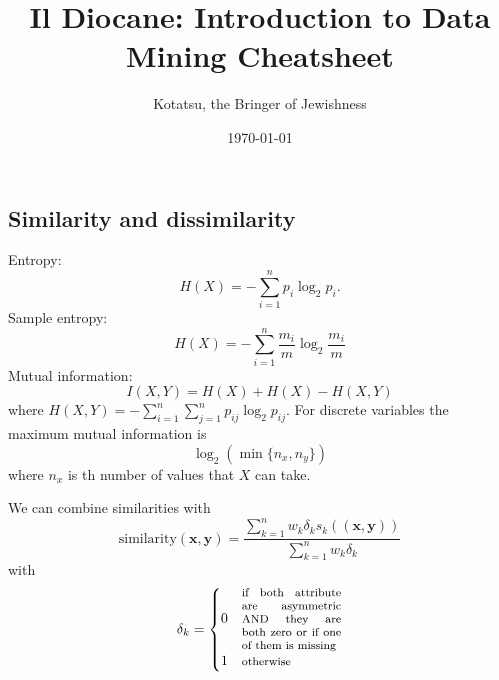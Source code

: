 \documentclass[a4paper,9pt]{extarticle}
\title{Il Diocane: Introduction to Data Mining Cheatsheet}
\author{\faSynagogue\;Kotatsu, the Bringer of Jewishness\;\faMenorah}
\date{\today}
\begin{document}
	
\maketitle
	
\begin{multicols*}{2}
\section{Similarity and dissimilarity}
\begin{riquadro}
	Entropy:
	\begin{equation*}
		H(X)=-\sum_{i=1}^{n}p_{i}\log_{2}p_i.
	\end{equation*}
	Sample entropy:
	\begin{equation*}
		H(X)=-\sum_{i=1}^{n}\frac{m_{i}}{m}\log_{2}\frac{m_{i}}{m}
	\end{equation*}
	Mutual information:
	\begin{equation*}
		I(X,Y)=H(X)+H(X)-H(X,Y)
	\end{equation*}
	where $H(X,Y)=-\sum_{i=1}^{n}\sum_{j=1}^{n}p_{ij}\log_{2}p_{ij}$. For discrete variables the maximum mutual information is 
	\begin{equation*}
		\log_{2}(\min\{n_{x},n_{y}\})
	\end{equation*}
	where $n_{x}$ is th number of values that $X$ can take.
\end{riquadro}
We can combine similarities with
\begin{equation*}
	\mathrm{similarity}(\mathbf{x},\mathbf{y})=\frac{\sum_{k=1}^{n}w_k\delta_{k}s_{k}((\mathbf{x},\mathbf{y}))}{\sum_{k=1}^{n}w_k\delta_{k}}
\end{equation*}
with
\begin{equation*}
	\delta_{k}=\begin{cases}
		0&\text{\footnotesize\parbox{2.5cm}{if both attribute are asymmetric AND they are both zero or if one of them is missing}}\\
		1&\text{\footnotesize otherwise}
	\end{cases}
\end{equation*}

\end{multicols*}
\end{document}
